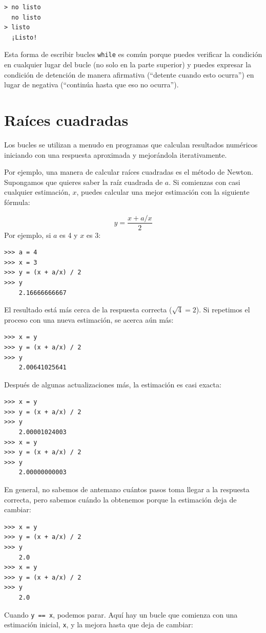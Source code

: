 \documentclass[10pt]{book}
\begin{document}
\begin{verbatim}
> no listo
  no listo
> listo
  ¡Listo!
\end{verbatim}
%
Esta forma de escribir bucles {\tt while} es común porque puedes
verificar la condición en cualquier lugar del bucle (no solo en la
parte superior) y puedes expresar la condición de detención de manera afirmativa
(``detente cuando esto ocurra'') en lugar de negativa (``continúa
hasta que eso no ocurra'').


\section{Raíces cuadradas}
\label{squareroot}

Los bucles se utilizan a menudo en programas que calculan
resultados numéricos iniciando con una respuesta aproximada y
mejorándola iterativamente.

Por ejemplo, una manera de calcular raíces cuadradas es el método de Newton.
Supongamos que quieres saber la raíz cuadrada de $a$.  Si comienzas
con casi cualquier estimación, $x$, puedes calcular una mejor
estimación con la siguiente fórmula:

\[ y = \frac{x + a/x}{2} \]
%
Por ejemplo, si $a$ es 4 y $x$ es 3:

\begin{verbatim}
>>> a = 4
>>> x = 3
>>> y = (x + a/x) / 2
>>> y
    2.16666666667
\end{verbatim}
%
El resultado está más cerca de la respuesta correcta ($\sqrt{4} = 2$).  Si
repetimos el proceso con una nueva estimación, se acerca aún más:

\begin{verbatim}
>>> x = y
>>> y = (x + a/x) / 2
>>> y
    2.00641025641
\end{verbatim}
%
Después de algunas actualizaciones más, la estimación es casi exacta:

\begin{verbatim}
>>> x = y
>>> y = (x + a/x) / 2
>>> y
    2.00001024003
>>> x = y
>>> y = (x + a/x) / 2
>>> y
    2.00000000003
\end{verbatim}
%
En general, no sabemos de antemano cuántos pasos toma
llegar a la respuesta correcta, pero sabemos cuándo la obtenemos
porque la estimación
deja de cambiar:

\begin{verbatim}
>>> x = y
>>> y = (x + a/x) / 2
>>> y
    2.0
>>> x = y
>>> y = (x + a/x) / 2
>>> y
    2.0
\end{verbatim}
%
Cuando {\tt y == x}, podemos parar.  Aquí hay un bucle que comienza
con una estimación inicial, {\tt x}, y la mejora hasta que
deja de cambiar:
\end{document}
